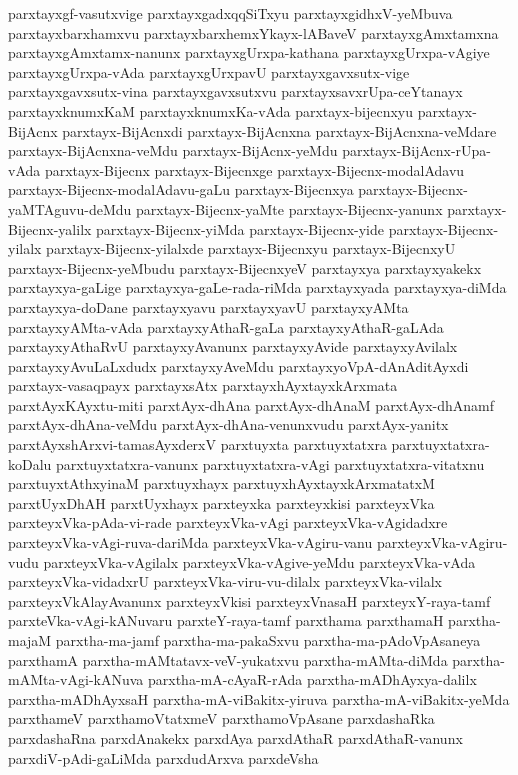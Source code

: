{parxtayxgf-vasutxvige
parxtayxgadxqqSiTxyu
parxtayxgidhxV-yeMbuva
parxtayxbarxhamxvu
parxtayxbarxhemxYkayx-lABaveV
parxtayxgAmxtamxna
parxtayxgAmxtamx-nanunx
parxtayxgUrxpa-kathana
parxtayxgUrxpa-vAgiye
parxtayxgUrxpa-vAda
parxtayxgUrxpavU
parxtayxgavxsutx-vige
parxtayxgavxsutx-vina
parxtayxgavxsutxvu
parxtayxsavxrUpa-ceYtanayx
parxtayxknumxKaM
parxtayxknumxKa-vAda
parxtayx-bijecnxyu
parxtayx-BijAcnx
parxtayx-BijAcnxdi
parxtayx-BijAcnxna
parxtayx-BijAcnxna-veMdare
parxtayx-BijAcnxna-veMdu
parxtayx-BijAcnx-yeMdu
parxtayx-BijAcnx-rUpa-vAda
parxtayx-Bijecnx
parxtayx-Bijecnxge
parxtayx-Bijecnx-modalAdavu
parxtayx-Bijecnx-modalAdavu-gaLu
parxtayx-Bijecnxya
parxtayx-Bijecnx-yaMTAguvu-deMdu
parxtayx-Bijecnx-yaMte
parxtayx-Bijecnx-yanunx
parxtayx-Bijecnx-yalilx
parxtayx-Bijecnx-yiMda
parxtayx-Bijecnx-yide
parxtayx-Bijecnx-yilalx
parxtayx-Bijecnx-yilalxde
parxtayx-Bijecnxyu
parxtayx-BijecnxyU
parxtayx-Bijecnx-yeMbudu
parxtayx-BijecnxyeV
parxtayxya
parxtayxyakekx
parxtayxya-gaLige
parxtayxya-gaLe-rada-riMda
parxtayxyada
parxtayxya-diMda
parxtayxya-doDane
parxtayxyavu
parxtayxyavU
parxtayxyAMta
parxtayxyAMta-vAda
parxtayxyAthaR-gaLa
parxtayxyAthaR-gaLAda
parxtayxyAthaRvU
parxtayxyAvanunx
parxtayxyAvide
parxtayxyAvilalx
parxtayxyAvuLaLxdudx
parxtayxyAveMdu
parxtayxyoVpA-dAnAditAyxdi
parxtayx-vasaqpayx
parxtayxsAtx
parxtayxhAyxtayxkArxmata
parxtAyxKAyxtu-miti
parxtAyx-dhAna
parxtAyx-dhAnaM
parxtAyx-dhAnamf
parxtAyx-dhAna-veMdu
parxtAyx-dhAna-venunxvudu
parxtAyx-yanitx
parxtAyxshArxvi-tamasAyxderxV
parxtuyxta
parxtuyxtatxra
parxtuyxtatxra-koDalu
parxtuyxtatxra-vanunx
parxtuyxtatxra-vAgi
parxtuyxtatxra-vitatxnu
parxtuyxtAthxyinaM
parxtuyxhayx
parxtuyxhAyxtayxkArxmatatxM
parxtUyxDhAH
parxtUyxhayx
parxteyxka
parxteyxkisi
parxteyxVka
parxteyxVka-pAda-vi-rade
parxteyxVka-vAgi
parxteyxVka-vAgidadxre
parxteyxVka-vAgi-ruva-dariMda
parxteyxVka-vAgiru-vanu
parxteyxVka-vAgiru-vudu
parxteyxVka-vAgilalx
parxteyxVka-vAgive-yeMdu
parxteyxVka-vAda
parxteyxVka-vidadxrU
parxteyxVka-viru-vu-dilalx
parxteyxVka-vilalx
parxteyxVkAlayAvanunx
parxteyxVkisi
parxteyxVnasaH
parxteyxY-raya-tamf
parxteVka-vAgi-kANuvaru
parxteY-raya-tamf
parxthama
parxthamaH
parxtha-majaM
parxtha-ma-jamf
parxtha-ma-pakaSxvu
parxtha-ma-pAdoVpAsaneya
parxthamA
parxtha-mAMtatavx-veV-yukatxvu
parxtha-mAMta-diMda
parxtha-mAMta-vAgi-kANuva
parxtha-mA-cAyaR-rAda
parxtha-mADhAyxya-dalilx
parxtha-mADhAyxsaH
parxtha-mA-viBakitx-yiruva
parxtha-mA-viBakitx-yeMda
parxthameV
parxthamoVtatxmeV
parxthamoVpAsane
parxdashaRka
parxdashaRna
parxdAnakekx
parxdAya
parxdAthaR
parxdAthaR-vanunx
parxdiV-pAdi-gaLiMda
parxdudArxva
parxdeVsha
}
